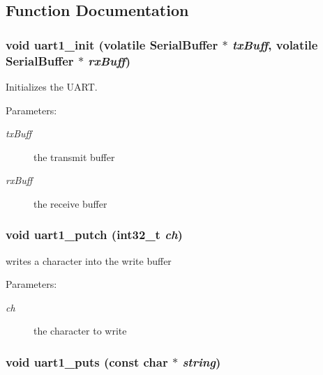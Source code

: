 \subsection{Function Documentation}
\hypertarget{group___u_a_r_t_gcc3cd7a0b6eb68cf02b2210cb8323459}{
\subsubsection[{uart1\_\-init}]{\setlength{\rightskip}{0pt plus 5cm}void uart1\_\-init (volatile {\bf SerialBuffer} $\ast$ {\em txBuff}, \/  volatile {\bf SerialBuffer} $\ast$ {\em rxBuff})}}
\label{group___u_a_r_t_gcc3cd7a0b6eb68cf02b2210cb8323459}


Initializes the UART. 

\begin{Desc}
\item[Parameters:]
\begin{description}
\item[{\em txBuff}]the transmit buffer \item[{\em rxBuff}]the receive buffer \end{description}
\end{Desc}
\hypertarget{group___u_a_r_t_g75dde68cc8f67ab4bfdf2ee60296265c}{
\subsubsection[{uart1\_\-putch}]{\setlength{\rightskip}{0pt plus 5cm}void uart1\_\-putch (int32\_\-t {\em ch})}}
\label{group___u_a_r_t_g75dde68cc8f67ab4bfdf2ee60296265c}


writes a character into the write buffer 

\begin{Desc}
\item[Parameters:]
\begin{description}
\item[{\em ch}]the character to write \end{description}
\end{Desc}
\hypertarget{group___u_a_r_t_ga5b52914c1970eda2abf78b6891c5202}{
\subsubsection[{uart1\_\-puts}]{\setlength{\rightskip}{0pt plus 5cm}void uart1\_\-puts (const char $\ast$ {\em string})}}
\label{group___u_a_r_t_ga5b52914c1970eda2abf78b6891c5202}


